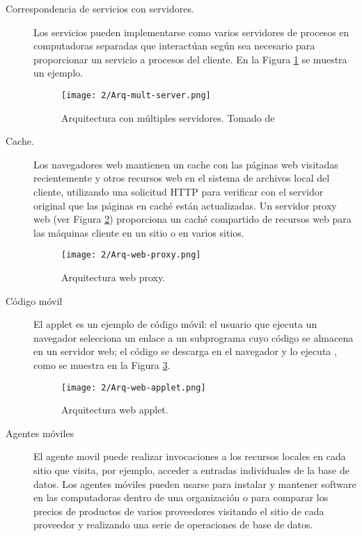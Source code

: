 	
	
	 
\begin{description}
	\item[ Correspondencia de servicios con servidores.] Los servicios pueden implementarse como varios servidores de procesos en computadoras separadas que interactúan según sea necesario para proporcionar un servicio a procesos del cliente. En la Figura \ref{fig:arq-multiserver} se muestra un ejemplo. 
	
	
	\begin{figure}[h]  
		\begin{center}%
		\texttt{[image: 2/Arq-mult-server.png]}
		\caption{Arquitectura con m\'ultiples servidores. Tomado de \cite{Coulouris2011} }
		\label{fig:arq-multiserver}
	 \end{center} 
 \end{figure} 
	
	
	\item[Cache.] Los navegadores web mantienen un \gls{cache} 
	con las páginas web visitadas recientemente y otros recursos web en el sistema de archivos local del cliente, utilizando
	una solicitud HTTP para verificar con el servidor original que las páginas en caché están actualizadas. Un \gls{servidor proxy} web (ver Figura \ref{fig:arq-webproxy}) proporciona un caché compartido de recursos web para las máquinas cliente en un sitio o en varios sitios. 
	
	\begin{figure}[h]
		\begin{center}%
		\texttt{[image: 2/Arq-web-proxy.png]}
		\caption{Arquitectura web proxy. }
		\label{fig:arq-webproxy}
	 \end{center} 
 \end{figure} 
	
	\item[ C\'odigo m\'ovil] El \gls{applet}  es un ejemplo   de código móvil: el usuario que ejecuta un navegador selecciona un enlace a un subprograma cuyo código se almacena en un servidor web; el código se descarga en el navegador y lo ejecuta , como se muestra en la Figura \ref{fig:arq-webapplet}.  
	
	\begin{figure}  
		\begin{center}%
		\texttt{[image: 2/Arq-web-applet.png]}
		\caption{Arquitectura web applet.  }
		\label{fig:arq-webapplet}
	 \end{center} 
 \end{figure} 
	
	\item[Agentes m\'oviles] El \gls{agente movil} puede realizar   invocaciones a los recursos locales en cada sitio que visita, por ejemplo, acceder a entradas individuales de la base de datos.  
	Los agentes móviles pueden usarse para instalar y mantener software en las computadoras dentro de una organización o para comparar los precios de productos de varios proveedores 	visitando el sitio de cada proveedor y realizando una serie de operaciones de base de datos.  
\end{description} 
